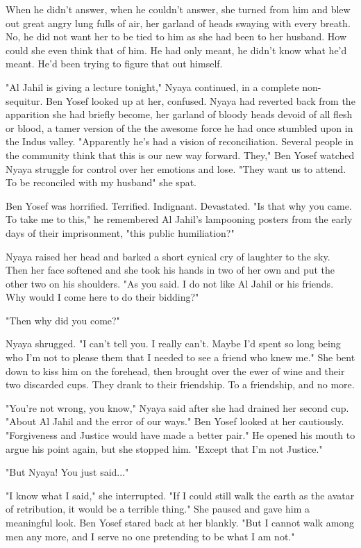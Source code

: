 \documentclass{amsart}
\begin{document}
When he didn't answer, when he couldn't answer, she turned from him and blew out great angry lung fulls of air, her garland of heads swaying with every breath. No, he did not want her to be tied to him as she had been to her husband. How could she even think that of him. He had only meant, he didn't know what he'd meant. He'd been trying to figure that out himself.

"Al Jahil is giving a lecture tonight," Nyaya continued, in a complete non-sequitur. Ben Yosef looked up at her, confused. Nyaya had reverted back from the apparition she had briefly become, her garland of bloody heads devoid of all flesh or blood, a tamer version of the the awesome force he had once stumbled upon in the Indus valley. "Apparently he's had a vision of reconciliation. Several people in the community think that this is our new way forward. They," Ben Yosef watched Nyaya struggle for control over her emotions and lose. "They want us to attend. To be reconciled with my husband" she spat.

Ben Yosef was horrified. Terrified. Indignant. Devastated. "Is that why you came. To take me to this," he remembered Al Jahil's lampooning posters from the early days of their imprisonment, "this public humiliation?"

Nyaya raised her head and barked a short cynical cry of laughter to the sky. Then her face softened and she took his hands in two of her own and put the other two on his shoulders. "As you said. I do not like Al Jahil or his friends. Why would I come here to do their bidding?"

"Then why did you come?"

Nyaya shrugged. "I can't tell you. I really can't. Maybe I'd spent so long being who I'm not to please them that I needed to see a friend who knew me." She bent down to kiss him on the forehead, then brought over the ewer of wine and their two discarded cups. They drank to their friendship. To a friendship, and no more. 

"You're not wrong, you know," Nyaya said after she had drained her second cup. "About Al Jahil and the error of our ways." Ben Yosef looked at her cautiously. "Forgiveness and Justice would have made a better pair." He opened his mouth to argue his point again, but she stopped him. "Except that I'm not Justice." 

"But Nyaya! You just said..."

"I know what I said," she interrupted. "If I could still walk the earth as the avatar of retribution, it would be a terrible thing." She paused and gave him a meaningful look. Ben Yosef stared back at her blankly. "But I cannot walk among men any more, and I serve no one pretending to be what I am not."
\end{document}
